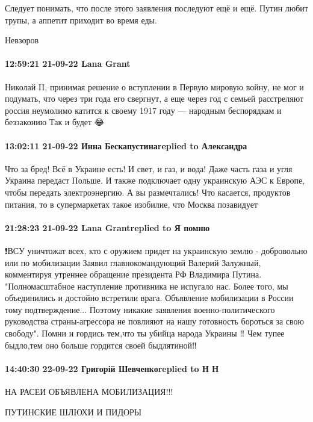 Следует понимать, что после этого заявления последуют ещё и ещё. Путин любит
трупы, а аппетит приходит во время еды.

Невзоров

\paragraph{12:59:21 21-09-22 Lana Grant}

Николай II, принимая решение о вступлении в Первую мировую войну, не мог и подумать, что через три года его свергнут, а еще через год с семьей расстреляют
россия неумолимо катится к своему 1917 году — народным беспорядкам и беззаконию
Так и будет 😂

\paragraph{13:02:11 21-09-22 Инна Бескапустинаreplied to Александра}

Что за бред! Всё в Украине есть! И свет, и газ, и вода! Даже часть газа и угля
Украина передаст Польше. И также подключает одну украинскую АЭС к Европе, чтобы
передать электроэнергию. А вы размечтались! Что касается, продуктов питания, то
в супермаркетах такое изобилие, что Москва позавидует


\paragraph{21:28:23 21-09-22 Lana Grantreplied to Я помню}

❗️ВСУ уничтожат всех, кто с оружием придет на украинскую землю - добровольно или по мобилизации
Заявил главнокомандующий Валерий Залужный, комментируя утреннее обращение президента РФ Владимира Путина.
"Полномасштабное наступление противника не испугало нас. Более того, мы объединились и достойно встретили врага. Объявление мобилизации в России тому подтверждение... Поэтому никакие заявления военно-политического руководства страны-агрессора не повлияют на нашу готовность бороться за свою свободу".
Помни и гордись тем,что ты убийца народа Украины ‼️ Чем тупее быдло,тем оно больше гордится своей быдлятиной‼️

\paragraph{14:40:30 22-09-22 Григорій Шевченкоreplied to Н Н}

НА РАСЕИ ОБЪЯВЛЕНА МОБИЛИЗАЦИЯ!!!


ПУТИНСКИЕ ШЛЮХИ И ПИДОРЫ


